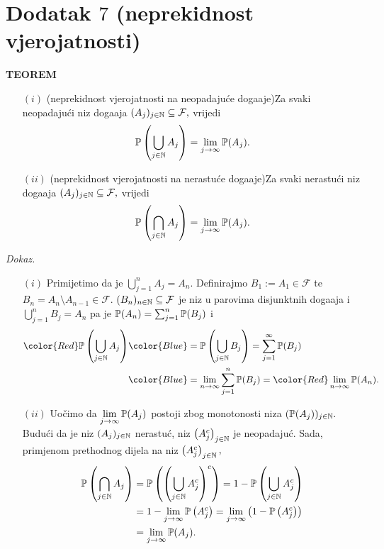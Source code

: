 \documentclass{article}
\begin{document}
\section{Dodatak \(7\) (neprekidnost vjerojatnosti)}
\textbf{TEOREM}
\begin{enumerate}
    \item[\((i)\)] (neprekidnost vjerojatnosti na neopadajuće doga\dj{}aje)\newline Za svaki neopadajući niz doga\dj{}aja \((A_j)_{j\in\Bbb N}\subseteq\mathcal F,\) vrijedi \[\Bbb P\left(\bigcup_{j\in\Bbb N}A_j\right)=\lim_{j\to\infty}\Bbb P(A_j).\]
    \item[\((ii)\)] (neprekidnost vjerojatnosti na nerastuće doga\dj{}aje)\newline Za svaki nerastući niz doga\dj{}aja \((A_j)_{j\in\Bbb N}\subseteq\mathcal F,\) vrijedi \[\Bbb P\left(\bigcap_{j\in\Bbb N}A_j\right)=\lim_{j\to\infty}\Bbb P(A_j).\] 
\end{enumerate}
\textit{Dokaz.}
\begin{enumerate}
    \item[\((i)\)] Primijetimo da je \(\bigcup_{j=1}^nA_j=A_n.\) Definirajmo \(B_1:=A_1\in\mathcal F\) te \(B_n=A_n\setminus A_{n-1}\in\mathcal F.\) \((B_n)_{n\in\Bbb N}\subseteq\mathcal F\) je niz u parovima disjunktnih doga\dj{}aja i \(\bigcup_{j=1}^nB_j=A_n\) pa je \(\Bbb P(A_n)=\sum_{j=1}^n\Bbb P(B_j)\) i \[\begin{aligned}\color{Red}\Bbb P\left(\bigcup_{j\in\Bbb N}A_j\right)&\color{Blue}=\Bbb P\left(\bigcup_{j\in\Bbb N}B_j\right)=\sum_{j=1}^\infty\Bbb P(B_j)\\&\color{Blue}=\lim_{n\to\infty}\sum_{j=1}^n\Bbb P(B_j)=\color{Red}\lim_{n\to\infty}\Bbb P(A_n).\end{aligned}\]
    \item[\((ii)\)] Uočimo da \(\lim\limits_{j\to\infty}\Bbb P(A_j)\) postoji zbog monotonosti niza \((\Bbb P(A_j))_{j\in\Bbb N}.\) Budući da je niz \((A_j)_{j\in\Bbb N}\) nerastuć, niz \(\left(A_j^c\right)_{j\in\Bbb N}\) je neopadajuć. Sada, primjenom prethodnog dijela na niz \(\left(A_j^c\right)_{j\in\Bbb N},\) \[\begin{aligned}\Bbb P\left(\bigcap_{j\in\Bbb N}A_j\right)&=\Bbb P\left(\left(\bigcup_{j\in\Bbb N}A_j^c\right)^c\right)=1-\Bbb P\left(\bigcup_{j\in\Bbb N}A_j^c\right)\\&=1-\lim_{j\to\infty}\Bbb P\left(A_j^c\right)=\lim_{j\to\infty}\left(1-\Bbb P\left(A_j^c\right)\right)\\&=\lim_{j\to\infty}\Bbb P(A_j).\end{aligned}\] 
\end{enumerate}
\end{document}
